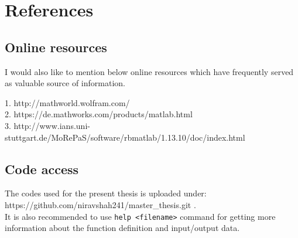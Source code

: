 \documentclass[a4paper]{book}
\begin{document}
\chapter{References}

\section{Online resources}

I would also like to mention below online resources which have frequently served as valuable source of information.\\

\begin{flushleft}
1. http://mathworld.wolfram.com/\\
2. https://de.mathworks.com/products/matlab.html\\
3. http://www.ians.uni-stuttgart.de/MoRePaS/software/rbmatlab/1.13.10/doc/index.html \\
\end{flushleft}

\section{Code access}

The codes used for the present thesis is uploaded under: \\
https://github.com/niravshah241/master\_thesis.git .\\


It is also recommended to use \verb|help <filename>| command for getting more information about the function definition and input/output data.



\end{document}
